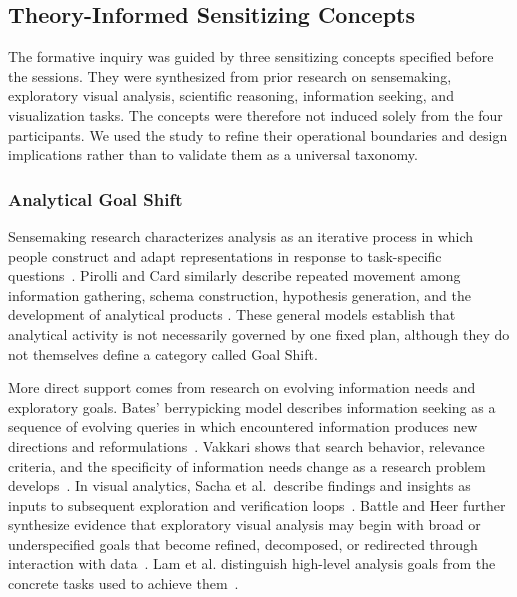 \documentclass[journal]{IEEEtran}
\begin{document}
\subsection{Theory-Informed Sensitizing Concepts}
\label{sec:formative-theory}

The formative inquiry was guided by three sensitizing concepts specified
before the sessions. They were synthesized from prior research on
sensemaking, exploratory visual analysis, scientific reasoning, information
seeking, and visualization tasks. The concepts were therefore not induced
solely from the four participants. We used the study to refine their
operational boundaries and design implications rather than to validate them
as a universal taxonomy.

\subsubsection{Analytical Goal Shift}

Sensemaking research characterizes analysis as an iterative process in which
people construct and adapt representations in response to task-specific
questions~\cite{russell1993cost}. Pirolli and Card similarly describe repeated
movement among information gathering, schema construction, hypothesis
generation, and the development of analytical products
\cite{pirolli2005sensemaking}. These general models establish that analytical
activity is not necessarily governed by one fixed plan, although they do not
themselves define a category called Goal Shift.

More direct support comes from research on evolving information needs and
exploratory goals. Bates' berrypicking model describes information seeking as
a sequence of evolving queries in which encountered information produces new
directions and reformulations~\cite{bates1989berrypicking}. Vakkari shows that
search behavior, relevance criteria, and the specificity of information needs
change as a research problem develops~\cite{vakkari2001changes}. In visual
analytics, Sacha et al.\ describe findings and insights as inputs to subsequent
exploration and verification loops~\cite{sacha2014knowledge}. Battle and Heer
further synthesize evidence that exploratory visual analysis may begin with
broad or underspecified goals that become refined, decomposed, or redirected
through interaction with data~\cite{battle2019characterizing}. Lam et al.
distinguish high-level analysis goals from the concrete tasks used to achieve
them~\cite{lam2018bridging}.
\end{document}
